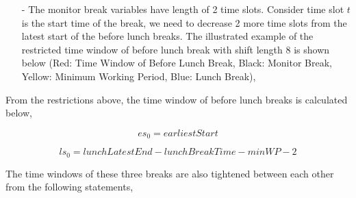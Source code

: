 \begin{itemize}
\begin{itemize}
\item[-] The monitor break variables have length of 2 time slots. Consider time slot $t$ is the start time of the break, we need to decrease 2 more time slots from the latest start of the before lunch breaks. The illustrated example of the restricted time window of before lunch break with shift length 8 is shown below (Red: Time Window of Before Lunch Break, Black: Monitor Break, Yellow: Minimum Working Period, Blue: Lunch Break), \\

\end{itemize}

From the restrictions above, the time window of before lunch breaks is calculated below,

\begin{equation}
es_0  = earliestStart
\end{equation}

\begin{equation}
ls_0 = lunchLatestEnd - lunchBreakTime- minWP -2
\end{equation}

The time windows of these three breaks are also tightened between each other from the following statements,


\end{itemize}
